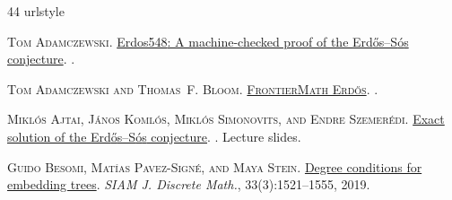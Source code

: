 \documentclass[a4paper,11pt]{article}
\begin{document}
%
%
\def\soft#1{\leavevmode\setbox0=\hbox{h}\dimen7=\ht0\advance \dimen7
  by-1ex\relax\if t#1\relax\rlap{\raise.6\dimen7
  \hbox{\kern.3ex\char'47}}#1\relax\else\if T#1\relax
  \rlap{\raise.5\dimen7\hbox{\kern1.3ex\char'47}}#1\relax \else\if
  d#1\relax\rlap{\raise.5\dimen7\hbox{\kern.9ex \char'47}}#1\relax\else\if
  D#1\relax\rlap{\raise.5\dimen7 \hbox{\kern1.4ex\char'47}}#1\relax\else\if
  l#1\relax \rlap{\raise.5\dimen7\hbox{\kern.4ex\char'47}}#1\relax \else\if
  L#1\relax\rlap{\raise.5\dimen7\hbox{\kern.7ex
  \char'47}}#1\relax\else\message{accent \string\soft \space #1 not
  defined!}#1\relax\fi\fi\fi\fi\fi\fi}
\begin{thebibliography}{44}
\providecommand{\natexlab}[1]{#1}
\providecommand{\msn}[1]{MR:\,\href{http://www.ams.org/mathscinet-getitem?mr=MR{#1}}{#1}}
\providecommand{\ZBL}[1]{Zbl:\,\href{https://www.zentralblatt-math.org/zmath/en/search/?q=an:#1}{#1}}
\providecommand{\url}[1]{\texttt{#1}}
\providecommand{\urlprefix}{}
\expandafter\ifx\csname urlstyle\endcsname\relax
  \providecommand{\doi}[1]{doi:\discretionary{}{}{}#1}\else
  \providecommand{\doi}{doi:\discretionary{}{}{}\begingroup
  \urlstyle{rm}\Url}\fi

\textsc{Tom Adamczewski}.
\newblock \href{https://reservoir.lean-lang.org/@tadamcz/Erdos548}{{Erdos548}:
  A machine-checked proof of the {Erd{\H{o}}s--S{\'o}s} conjecture}.
.

\textsc{Tom Adamczewski and Thomas~F. Bloom}.
\newblock
  \href{https://epoch.ai/files/frontiermath-erdos.pdf}{\textsc{FrontierMath
  Erd\H{o}s}}.
.

\textsc{Mikl{\'o}s Ajtai, J{\'a}nos Koml{\'o}s, Mikl{\'o}s Simonovits, and
  Endre Szemer{\'e}di}.
\newblock
  \href{https://imada.sdu.dk/Research/GT2015/Talks/Slides/simonovits.pdf}{Exact
  solution of the {Erd{\H{o}}s--S{\'o}s} conjecture}.
.
\newblock Lecture slides.

\textsc{Guido Besomi, Mat{\'\i}as Pavez-Sign{\'e}, and Maya Stein}.
\newblock \href{https://doi.org/10.1137/18M1210861}{Degree conditions for
  embedding trees}.
\newblock \emph{SIAM J. Discrete Math.}, 33(3):1521--1555, 2019.


\end{thebibliography}
\end{document}
